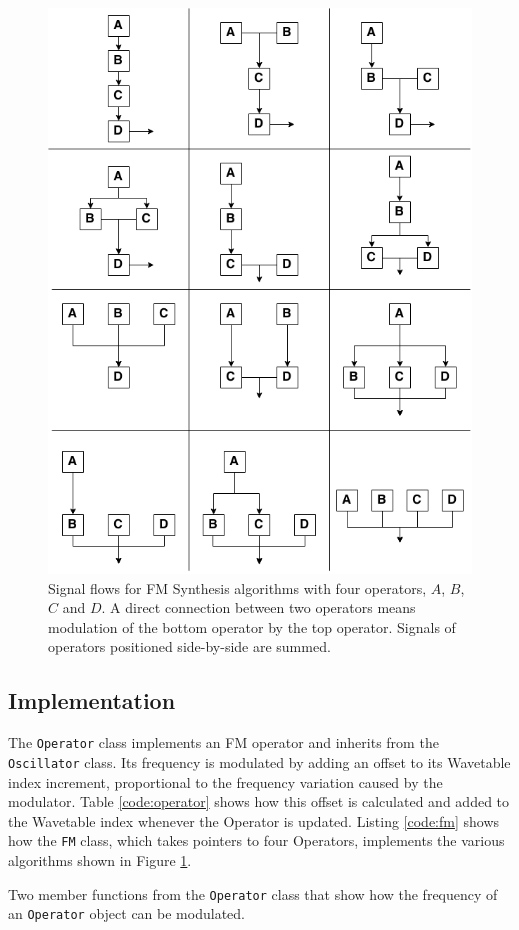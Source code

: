   \begin{figure}[p!]
    \includegraphics[scale=0.75]{img/fmalgs}
    \caption{Signal flows for FM Synthesis algorithms with four operators, $A$, $B$, $C$ and $D$. A direct connection between two operators means modulation of the bottom operator by the top operator. Signals of operators positioned side-by-side are summed.}
    \label{fig:fmalgs}
  \end{figure}

  \subsection{Implementation}

  The \texttt{Operator} class implements an FM operator and inherits from the \texttt{Oscillator} class. Its frequency is modulated by adding an offset to its Wavetable index increment, proportional to the frequency variation caused by the modulator. Table \ref{code:operator} shows how this offset is calculated and added to the Wavetable index whenever the Operator is updated. Listing \ref{code:fm} shows how the \texttt{FM} class, which takes pointers to four Operators, implements the various algorithms shown in Figure \ref{fig:fmalgs}.

  \begin{table}[hb!]
    \caption{Two member functions from the \texttt{Operator} class that show how the frequency of an \texttt{Operator} object can be modulated.}
    \label{code:operator}
  \end{table}
